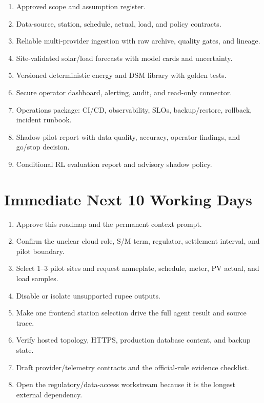 \documentclass[11pt,a4paper]{article}
\begin{document}
\begin{enumerate}
  \item Approved scope and assumption register.
  \item Data-source, station, schedule, actual, load, and policy contracts.
  \item Reliable multi-provider ingestion with raw archive, quality gates, and lineage.
  \item Site-validated solar/load forecasts with model cards and uncertainty.
  \item Versioned deterministic energy and DSM library with golden tests.
  \item Secure operator dashboard, alerting, audit, and read-only connector.
  \item Operations package: CI/CD, observability, SLOs, backup/restore, rollback, incident runbook.
  \item Shadow-pilot report with data quality, accuracy, operator findings, and go/stop decision.
  \item Conditional RL evaluation report and advisory shadow policy.
\end{enumerate}

\section{Immediate Next 10 Working Days}

\begin{enumerate}
  \item Approve this roadmap and the permanent context prompt.
  \item Confirm the unclear cloud role, S/M term, regulator, settlement interval, and pilot boundary.
  \item Select 1--3 pilot sites and request nameplate, schedule, meter, PV actual, and load samples.
  \item Disable or isolate unsupported rupee outputs.
  \item Make one frontend station selection drive the full agent result and source trace.
  \item Verify hosted topology, HTTPS, production database content, and backup state.
  \item Draft provider/telemetry contracts and the official-rule evidence checklist.
  \item Open the regulatory/data-access workstream because it is the longest external dependency.
\end{enumerate}
\end{document}
